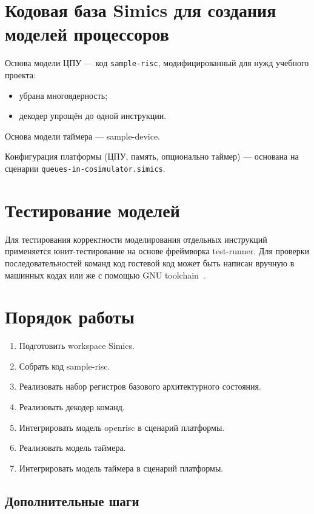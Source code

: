 \section{Кодовая база Simics для создания моделей процессоров}

Основа модели ЦПУ --- код \texttt{sample-risc}, модифицированный для нужд учебного проекта:
\begin{itemize}
    \item убрана многоядерность;
    \item декодер упрощён до одной инструкции.
\end{itemize}

Основа модели таймера --- sample-device.

Конфигурация платформы (ЦПУ, память, опционально таймер) --- основана на сценарии \texttt{queues-in-cosimulator.simics}.

\section{Тестирование моделей}

Для тестирования корректности моделирования отдельных инструкций применяется юнит-тестирование на основе фреймворка test-runner. Для проверки последовательностей команд код гостевой код может быть написан вручную в машинных кодах или же с помощью GNU toolchain~\cite{or1k-toolchain}.


\section{Порядок работы}

\begin{enumerate}
\item Подготовить workspace Simics.
\item Собрать код sample-risc.
\item Реализовать набор регистров базового архитектурного состояния.
\item Реализовать декодер команд.
\item Интегрировать модель openrisc в сценарий платформы.
\item Реализовать модель таймера.
\item Интегрировать модель таймера в сценарий платформы.

\end{enumerate}

\subsection{Дополнительные шаги}

